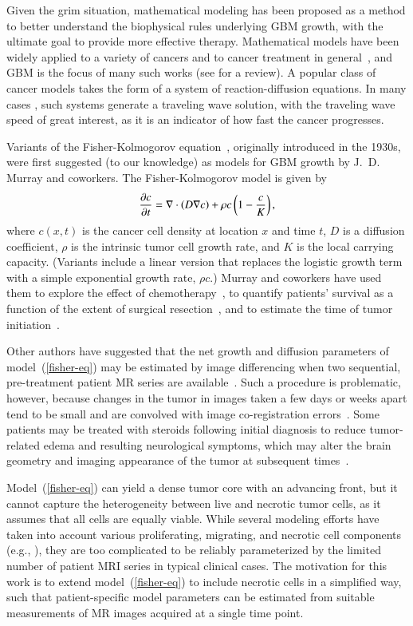 \documentclass{aims}
\numberwithin{equation}{section}
\begin{document}
Given the grim situation, mathematical modeling has been proposed as a
method to better understand the biophysical rules underlying GBM growth,
with the ultimate goal to provide more effective therapy.  Mathematical
models have been widely applied to a variety of cancers and to cancer
treatment in general~\cite{Kuang}, and GBM is the focus of many such works
(see \cite{Martirosyan2015} for a review).  A popular class of cancer models
takes the form of a system of reaction-diffusion equations. In many cases
\cite{Harley2014,Gerlee2016,Stepien2018}, such systems generate a traveling
wave solution, with the traveling wave speed of great interest, as it is an
indicator of how fast the cancer progresses.

Variants of the Fisher-Kolmogorov equation~\cite{Fisher1937}, originally introduced
in the 1930s, were first suggested (to our knowledge)
as models for GBM growth by J.~D. Murray and coworkers.
The Fisher-Kolmogorov model is given by
\begin{equation}
\frac{\partial c}{\partial t} = \nabla\cdot\left(D \nabla{c}\right) + \rho c \left(1 - \frac{c}{K}\right),
\label{fisher-eq}
\end{equation}
where $c(x,t)$ is the cancer cell density at location $x$ and time $t$, $D$
is a diffusion coefficient, $\rho$ is the intrinsic tumor cell growth rate,
and $K$ is the local carrying capacity.  (Variants include a linear version
that replaces the logistic growth term with a simple exponential growth
rate, $\rho c$.)  Murray and coworkers have used them to explore the effect of
chemotherapy~\cite{Tracqui1995}, to quantify patients' survival as a function
of the extent of surgical resection~\cite{Woodward1996},
and to estimate the time of tumor initiation~\cite{Murray2012}.

Other authors have suggested that the net growth and diffusion parameters
of model~(\ref{fisher-eq}) may be estimated by image differencing when
two sequential, pre-treatment patient MR series are
available~\cite{Swanson2008,Neal2013,Jackson2015a}.
Such a procedure is problematic, however, because changes in
the tumor in images taken a few days or weeks apart tend to be small
and are convolved with image co-registration errors~\cite{vanderHorn2016}.
Some patients may be treated with
steroids following initial diagnosis to reduce tumor-related edema and
resulting neurological symptoms,
which may alter the brain geometry and imaging appearance of the
tumor at subsequent times~\cite{Watling1994,Zaki2004}.

Model~(\ref{fisher-eq}) can yield a dense tumor
core with an advancing front, but it cannot capture the heterogeneity between
live and necrotic tumor cells, as it assumes that all cells are equally
viable.  While several modeling efforts have taken into account various
proliferating, migrating, and necrotic cell components (e.g.,
\cite{Eikenberry2009,Swanson2011}), they are too complicated to be reliably
parameterized by the limited number of patient MRI series in typical
clinical cases.  The motivation for this work is to extend model~(\ref{fisher-eq})
to include necrotic cells in a simplified way, such that
patient-specific model parameters can be estimated from suitable measurements of MR
images acquired at a single time point.
\end{document}
